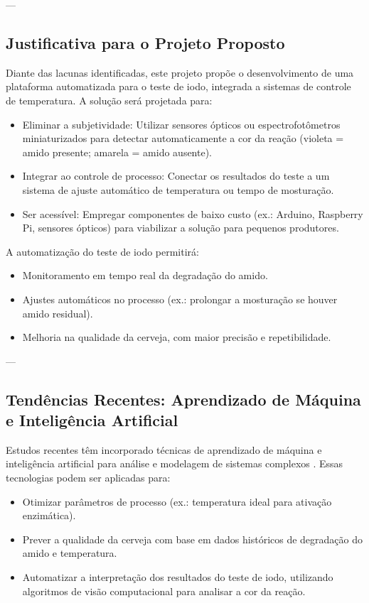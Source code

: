 ---

\subsection{Justificativa para o Projeto Proposto}
Diante das lacunas identificadas, este projeto propõe o desenvolvimento de uma plataforma automatizada para o teste de iodo, integrada a sistemas de controle de temperatura. A solução será projetada para:

\begin{itemize}
    \item Eliminar a subjetividade: Utilizar sensores ópticos ou espectrofotômetros miniaturizados para detectar automaticamente a cor da reação (violeta = amido presente; amarela = amido ausente).
    \item Integrar ao controle de processo: Conectar os resultados do teste a um sistema de ajuste automático de temperatura ou tempo de mosturação.
    \item Ser acessível: Empregar componentes de baixo custo (ex.: Arduino, Raspberry Pi, sensores ópticos) para viabilizar a solução para pequenos produtores.
\end{itemize}

A automatização do teste de iodo permitirá:
\begin{itemize}
    \item Monitoramento em tempo real da degradação do amido.
    \item Ajustes automáticos no processo (ex.: prolongar a mosturação se houver amido residual).
    \item Melhoria na qualidade da cerveja, com maior precisão e repetibilidade.
\end{itemize}

---

\subsection{Tendências Recentes: Aprendizado de Máquina e Inteligência Artificial}
Estudos recentes têm incorporado técnicas de aprendizado de máquina e inteligência artificial para análise e modelagem de sistemas complexos \cite{zhang2025}. Essas tecnologias podem ser aplicadas para:
\begin{itemize}
    \item Otimizar parâmetros de processo (ex.: temperatura ideal para ativação enzimática).
    \item Prever a qualidade da cerveja com base em dados históricos de degradação do amido e temperatura.
    \item Automatizar a interpretação dos resultados do teste de iodo, utilizando algoritmos de visão computacional para analisar a cor da reação.
\end{itemize}

